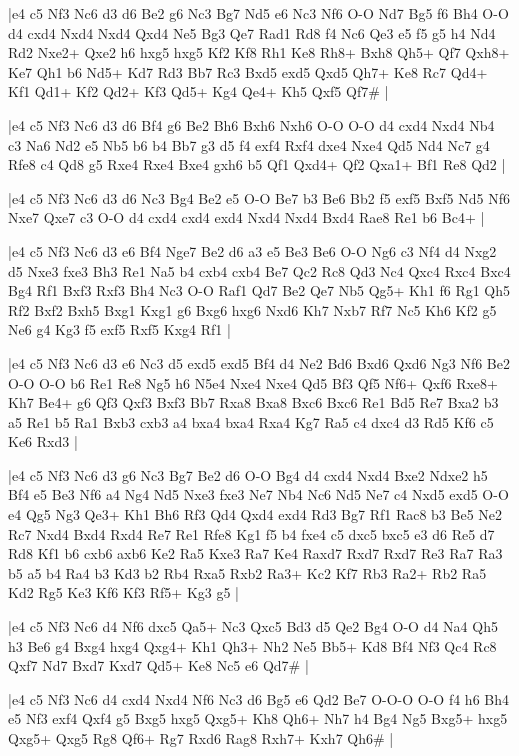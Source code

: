 \whitename{}
\blackname{}
\makegametitle
|e4 c5 Nf3 Nc6 d3 d6 Be2 g6 Nc3 Bg7 Nd5 e6 Nc3 Nf6 O-O Nd7 Bg5 f6 Bh4 O-O d4 cxd4 Nxd4 Nxd4 Qxd4 Ne5 Bg3 Qe7 Rad1 Rd8 f4 Nc6 Qe3 e5 f5 g5 h4 Nd4 Rd2 Nxe2+ Qxe2 h6 hxg5 hxg5 Kf2 Kf8 Rh1 Ke8 Rh8+ Bxh8 Qh5+ Qf7 Qxh8+ Ke7 Qh1 b6 Nd5+ Kd7 Rd3 Bb7 Rc3 Bxd5 exd5 Qxd5 Qh7+ Ke8 Rc7 Qd4+ Kf1 Qd1+ Kf2 Qd2+ Kf3 Qd5+ Kg4 Qe4+ Kh5 Qxf5 Qf7\#  |

\whitename{}
\blackname{}
\makegametitle
|e4 c5 Nf3 Nc6 d3 d6 Bf4 g6 Be2 Bh6 Bxh6 Nxh6 O-O O-O d4 cxd4 Nxd4 Nb4 c3 Na6 Nd2 e5 Nb5 b6 b4 Bb7 g3 d5 f4 exf4 Rxf4 dxe4 Nxe4 Qd5 Nd4 Nc7 g4 Rfe8 c4 Qd8 g5 Rxe4 Rxe4 Bxe4 gxh6 b5 Qf1 Qxd4+ Qf2 Qxa1+ Bf1 Re8 Qd2  |

\whitename{}
\blackname{}
\makegametitle
|e4 c5 Nf3 Nc6 d3 d6 Nc3 Bg4 Be2 e5 O-O Be7 b3 Be6 Bb2 f5 exf5 Bxf5 Nd5 Nf6 Nxe7 Qxe7 c3 O-O d4 cxd4 cxd4 exd4 Nxd4 Nxd4 Bxd4 Rae8 Re1 b6 Bc4+  |

\whitename{}
\blackname{}
\makegametitle
|e4 c5 Nf3 Nc6 d3 e6 Bf4 Nge7 Be2 d6 a3 e5 Be3 Be6 O-O Ng6 c3 Nf4 d4 Nxg2 d5 Nxe3 fxe3 Bh3 Re1 Na5 b4 cxb4 cxb4 Be7 Qc2 Rc8 Qd3 Nc4 Qxc4 Rxc4 Bxc4 Bg4 Rf1 Bxf3 Rxf3 Bh4 Nc3 O-O Raf1 Qd7 Be2 Qe7 Nb5 Qg5+ Kh1 f6 Rg1 Qh5 Rf2 Bxf2 Bxh5 Bxg1 Kxg1 g6 Bxg6 hxg6 Nxd6 Kh7 Nxb7 Rf7 Nc5 Kh6 Kf2 g5 Ne6 g4 Kg3 f5 exf5 Rxf5 Kxg4 Rf1  |

\whitename{}
\blackname{}
\makegametitle
|e4 c5 Nf3 Nc6 d3 e6 Nc3 d5 exd5 exd5 Bf4 d4 Ne2 Bd6 Bxd6 Qxd6 Ng3 Nf6 Be2 O-O O-O b6 Re1 Re8 Ng5 h6 N5e4 Nxe4 Nxe4 Qd5 Bf3 Qf5 Nf6+ Qxf6 Rxe8+ Kh7 Be4+ g6 Qf3 Qxf3 Bxf3 Bb7 Rxa8 Bxa8 Bxc6 Bxc6 Re1 Bd5 Re7 Bxa2 b3 a5 Re1 b5 Ra1 Bxb3 cxb3 a4 bxa4 bxa4 Rxa4 Kg7 Ra5 c4 dxc4 d3 Rd5 Kf6 c5 Ke6 Rxd3  |

\whitename{}
\blackname{}
\makegametitle
|e4 c5 Nf3 Nc6 d3 g6 Nc3 Bg7 Be2 d6 O-O Bg4 d4 cxd4 Nxd4 Bxe2 Ndxe2 h5 Bf4 e5 Be3 Nf6 a4 Ng4 Nd5 Nxe3 fxe3 Ne7 Nb4 Nc6 Nd5 Ne7 c4 Nxd5 exd5 O-O e4 Qg5 Ng3 Qe3+ Kh1 Bh6 Rf3 Qd4 Qxd4 exd4 Rd3 Bg7 Rf1 Rac8 b3 Be5 Ne2 Rc7 Nxd4 Bxd4 Rxd4 Re7 Re1 Rfe8 Kg1 f5 b4 fxe4 c5 dxc5 bxc5 e3 d6 Re5 d7 Rd8 Kf1 b6 cxb6 axb6 Ke2 Ra5 Kxe3 Ra7 Ke4 Raxd7 Rxd7 Rxd7 Re3 Ra7 Ra3 b5 a5 b4 Ra4 b3 Kd3 b2 Rb4 Rxa5 Rxb2 Ra3+ Kc2 Kf7 Rb3 Ra2+ Rb2 Ra5 Kd2 Rg5 Ke3 Kf6 Kf3 Rf5+ Kg3 g5  |

\whitename{}
\blackname{}
\makegametitle
|e4 c5 Nf3 Nc6 d4 Nf6 dxc5 Qa5+ Nc3 Qxc5 Bd3 d5 Qe2 Bg4 O-O d4 Na4 Qh5 h3 Be6 g4 Bxg4 hxg4 Qxg4+ Kh1 Qh3+ Nh2 Ne5 Bb5+ Kd8 Bf4 Nf3 Qc4 Rc8 Qxf7 Nd7 Bxd7 Kxd7 Qd5+ Ke8 Nc5 e6 Qd7\#  |

\whitename{}
\blackname{}
\makegametitle
|e4 c5 Nf3 Nc6 d4 cxd4 Nxd4 Nf6 Nc3 d6 Bg5 e6 Qd2 Be7 O-O-O O-O f4 h6 Bh4 e5 Nf3 exf4 Qxf4 g5 Bxg5 hxg5 Qxg5+ Kh8 Qh6+ Nh7 h4 Bg4 Ng5 Bxg5+ hxg5 Qxg5+ Qxg5 Rg8 Qf6+ Rg7 Rxd6 Rag8 Rxh7+ Kxh7 Qh6\#  |

